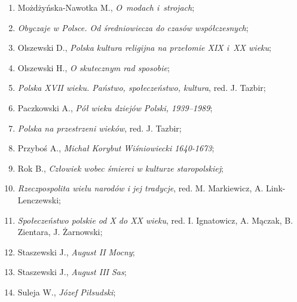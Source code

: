 \documentclass[a4paper,11pt]{article}
\begin{document}
\begin{enumerate}
\item Możdżyńska-Nawotka M., \textit{O~modach i~strojach};



\item \textit{Obyczaje w Polsce. Od średniowiecza do czasów
    współczesnych};



\item Olszewski D., \textit{Polska kultura religijna na przełomie XIX
    i~XX wieku};



\item Olszewski H., \textit{O skutecznym rad sposobie};



\item \textit{Polska XVII wieku. Państwo, społeczeństwo, kultura}, red.
  J. Tazbir;



\item Paczkowski A., \textit{Pół wieku dziejów Polski, 1939--1989};



\item \textit{Polska na przestrzeni wieków}, red. J. Tazbir;



\item Przyboś A., \textit{Michał Korybut Wiśniowiecki 1640-1673};



\item Rok B., \textit{Człowiek wobec śmierci w kulturze staropolskiej};



\item \textit{Rzeczpospolita wielu narodów i jej tradycje}, red. M.
  Markiewicz, A. Link-Lenczewski;



\item \textit{Społeczeństwo polskie od X do XX wieku}, red. I.
  Ignatowicz, A. Mączak, B. Zientara, J. Żarnowski;



\item Staszewski J., \textit{August II Mocny};



\item Staszewski J., \textit{August III Sas};



\item Suleja W., \textit{Józef Piłsudski};




\end{enumerate}
\end{document}
